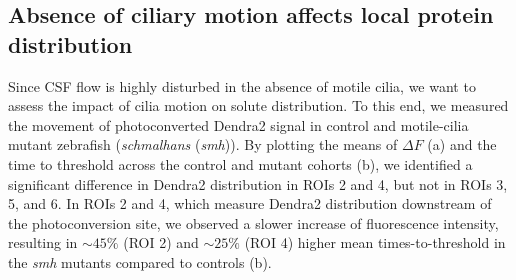 \documentclass[fleqn]{wlscirep}
\begin{document}

\subsection*{Absence of ciliary motion affects local protein distribution}
Since CSF flow is highly disturbed in the absence of motile cilia, we
want to assess the impact of cilia motion on solute distribution. To this end,
we measured the movement of photoconverted Dendra2 signal
in control and motile-cilia mutant zebrafish (\emph{schmalhans} (\emph{smh})).
By plotting the means of $\Delta F$ (a)
and the time to threshold
across the control and mutant cohorts (b),
we identified a significant
difference in Dendra2 distribution in ROIs 2 and 4, but not in ROIs 3, 5, and 6. In ROIs 2 and 4,
which measure Dendra2 distribution downstream of the photoconversion site,
we observed a slower increase of fluorescence intensity,
resulting in $\sim 45\%$ (ROI 2) and $\sim 25\%$ (ROI 4)
higher mean times-to-threshold in the \emph{smh}
mutants compared to controls (b). 
\end{document}
